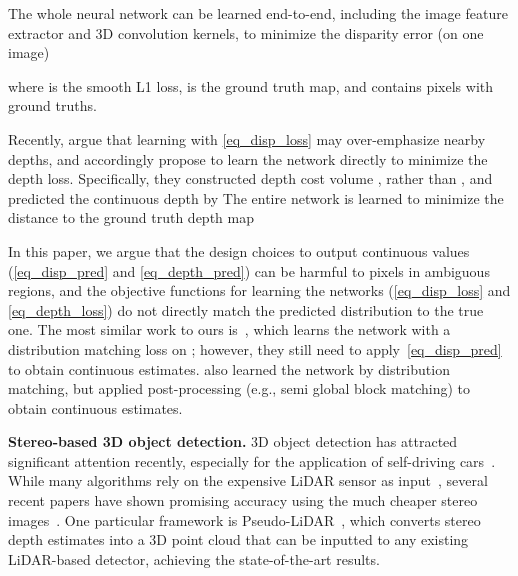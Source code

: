 \documentclass{article}
\renewcommand{\paragraph}[1]{\vspace{-0.5ex}\textbf{#1}}
\newcommand{\eg}{e.g.\xspace}
\begin{document}
The whole neural network can be learned end-to-end, including the image feature extractor and 3D convolution kernels, to minimize the disparity error (on one image)

where  is the smooth L1 loss,  is the ground truth map, and  contains pixels with ground truths. 





Recently, \cite{you2019pseudo} argue that learning with \autoref{eq_disp_loss} may over-emphasize nearby depths, and accordingly propose to learn the network directly to minimize the depth loss. Specifically, they constructed depth cost volume  , rather than , and predicted the continuous depth by 
The entire network is learned to minimize the distance to the ground truth depth map 

In this paper, we argue that the design choices to output continuous values (\autoref{eq_disp_pred} and \autoref{eq_depth_pred}) can be harmful to pixels in ambiguous regions, and the objective functions for learning the networks (\autoref{eq_disp_loss} and \autoref{eq_depth_loss}) do not directly match the predicted distribution to the true one. The most similar work to ours is~\cite{zhang2020adaptive}, which learns the network with a distribution matching loss on ; however, they still need to apply~\autoref{eq_disp_pred} to obtain continuous estimates. \citet{luo2016efficient} also learned the network by distribution matching, but applied post-processing (\eg, semi global block matching) to obtain continuous estimates.

\paragraph{Stereo-based 3D object detection.} 3D object detection has attracted significant attention recently, especially for the application of self-driving cars~\cite{geiger2012we,geiger2013vision,argoverse,nuscenes2019,waymo_open_dataset,lyft2019}. While many algorithms rely on the expensive LiDAR sensor as input~\cite{shi2019pointrcnn,lang2019pointpillars,yang2018pixor,qi2018frustum,ku2018joint}, several recent papers have shown promising accuracy using the much cheaper stereo images~\cite{li2019gs3d,xu2018multi,chen2020dsgn,li2019stereo,konigshofrealtime,xu2020zoomnet,pon2019object}. One particular framework is Pseudo-LiDAR~\cite{pseudoLiDAR,you2019pseudo,qian2020end}, which converts stereo depth estimates into a 3D point cloud that can be inputted to any existing LiDAR-based detector, achieving the state-of-the-art results.
\end{document}
